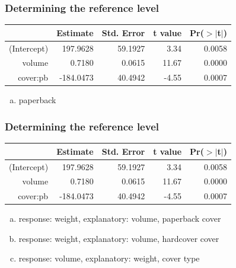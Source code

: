 \begin{frame}
\frametitle{Determining the reference level}


{\small
\begin{center}
\begin{tabular}{rrrrr}
  \hline
 & Estimate & Std. Error & t value & Pr($>$$|$t$|$) \\ 
  \hline
(Intercept) & 197.9628 & 59.1927 & 3.34 & 0.0058 \\ 
  volume & 0.7180 & 0.0615 & 11.67 & 0.0000 \\ 
  cover:pb & -184.0473 & 40.4942 & -4.55 & 0.0007 \\ 
   \hline
\end{tabular}
\end{center}
}

\begin{enumerate}[(a)]
\item paperback
\end{enumerate}

\end{frame}


\begin{frame}
\frametitle{Determining the reference level}


{\small
\begin{center}
\begin{tabular}{rrrrr}
  \hline
 & Estimate & Std. Error & t value & Pr($>$$|$t$|$) \\ 
  \hline
(Intercept) & 197.9628 & 59.1927 & 3.34 & 0.0058 \\ 
  volume & 0.7180 & 0.0615 & 11.67 & 0.0000 \\ 
  cover:pb & -184.0473 & 40.4942 & -4.55 & 0.0007 \\ 
   \hline
\end{tabular}
\end{center}
}

\begin{enumerate}[(a)]
\item response: weight, explanatory: volume, paperback cover
\item response: weight, explanatory: volume, hardcover cover
\item response: volume, explanatory: weight, cover type
\end{enumerate}

\end{frame}

